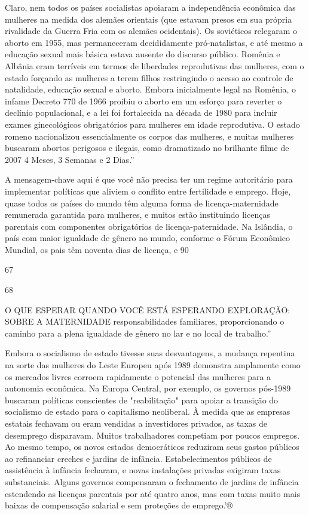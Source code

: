 Claro, nem todos os países socialistas apoiaram a independência econômica das mulheres na medida dos alemães orientais (que estavam presos em sua própria rivalidade da Guerra Fria com os alemães ocidentais). Os soviéticos relegaram o aborto em 1955, mas permaneceram decididamente pró-natalistas, e até mesmo a educação sexual mais básica estava ausente do discurso público. Romênia e Albânia eram terríveis em termos de liberdades reprodutivas das mulheres, com o estado forçando as mulheres a terem filhos restringindo o acesso ao controle de natalidade, educação sexual e aborto. Embora inicialmente legal na Romênia, o infame Decreto {\color{blue}770} de 1966 proibiu o aborto em um esforço para reverter o declínio populacional, e a lei foi fortalecida na década de 1980 para incluir exames ginecológicos obrigatórios para mulheres em idade reprodutiva. O estado romeno nacionalizou essencialmente os corpos das mulheres, e muitas mulheres buscaram abortos perigosos e ilegais, como dramatizado no brilhante filme de 2007 {\color{blue}4} Meses, {\color{blue}3} Semanas e {\color{blue}2} Dias.”
 \par 
A mensagem-chave aqui é que você não precisa ter um regime autoritário para implementar políticas que aliviem o conflito entre fertilidade e emprego. Hoje, quase todos os países do mundo têm alguma forma de licença-maternidade remunerada garantida para mulheres, e muitos estão instituindo licenças parentais com componentes obrigatórios de licença-paternidade. Na Islândia, o país com maior igualdade de gênero no mundo, conforme o Fórum Econômico Mundial, os pais têm noventa dias de licença, e 90%
 \par 
67
 \par 
68
 \par 
O QUE ESPERAR QUANDO VOCÊ ESTÁ ESPERANDO EXPLORAÇÃO: SOBRE A MATERNIDADE responsabilidades familiares, proporcionando o caminho para a plena igualdade de gênero no lar e no local de trabalho.”
 \par 
Embora o socialismo de estado tivesse suas desvantagens, a mudança repentina na sorte das mulheres do Leste Europeu após 1989 demonstra amplamente como os mercados livres corroem rapidamente o potencial das mulheres para a autonomia econômica. Na Europa Central, por exemplo, os governos pós-1989 buscaram políticas conscientes de "reabilitação" para apoiar a transição do socialismo de estado para o capitalismo neoliberal. À medida que as empresas estatais fechavam ou eram vendidas a investidores privados, as taxas de desemprego disparavam. Muitos trabalhadores competiam por poucos empregos. Ao mesmo tempo, os novos estados democráticos reduziram seus gastos públicos ao refinanciar creches e jardins de infância. Estabelecimentos públicos de assistência à infância fecharam, e novas instalações privadas exigiram taxas substanciais. Alguns governos compensaram o fechamento de jardins de infância estendendo as licenças parentais por até quatro anos, mas com taxas muito mais baixas de compensação salarial e sem proteções de emprego.'®
